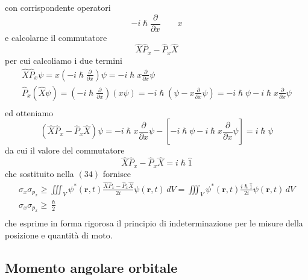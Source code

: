 con corrispondente operatori \[
	- i \hslash \frac{\partial}{\partial x} \qquad x
\] e calcolarne il commutatore
\[
	\hat{X}\hat{P}_{x} - \hat{P}_{x}\hat{X}
\] per cui calcoliamo i due termini \begin{gather*}
	\hat{X}\hat{P}_{x} \psi = x \left(  - i \hslash \frac{\partial}{\partial x} \right) \psi = - i \hslash x \frac{\partial}{\partial x}\psi\\
	\hat{P}_{x}(\hat{X} \psi) = \left( - i \hslash \frac{\partial}{\partial x} \right)(x \psi)  = - i \hslash \left( \psi - x \frac{\partial}{\partial x} \psi \right) = - i \hslash \psi - i \hslash x \frac{\partial}{\partial x} \psi\\
\end{gather*} ed otteniamo \[
	(\hat{X}\hat{P}_{x} - \hat{P}_{x}\hat{X}) \psi = - i \hslash x \frac{\partial}{\partial x}\psi - \left[ - i \hslash \psi - i \hslash x \frac{\partial}{\partial x} \psi \right] = i \hslash \psi
\] da cui il valore del commutatore \[
	\hat{X}\hat{P}_{x} - \hat{P}_{x}\hat{X} = i \hslash  \hat{1}
\] che sostituito nella \((34)\) fornisce
\begin{gather*}
	\sigma_{x} \sigma_{p_{x}} \geq \iiint_{V} \psi^{*}(\bm{r},t) \frac{\hat{X}\hat{P}_{x} - \hat{P}_{x}\hat{X}}{2 i } \psi(\bm{r},t) \, dV =
	\iiint_{V} \psi^{*}(\bm{r},t) \frac{i \hslash  \hat{1}}{2i}\psi(\bm{r},t) \, dV\\
	\sigma_{x}\sigma_{p_{x}} \geq \frac{\hslash}{2}\\
\end{gather*} che esprime in forma rigorosa il principio di indeterminazione per le
misure della posizione e quantità di moto.

\subsection{Momento angolare orbitale}\label{sec:momento-angolare-orbitale}

